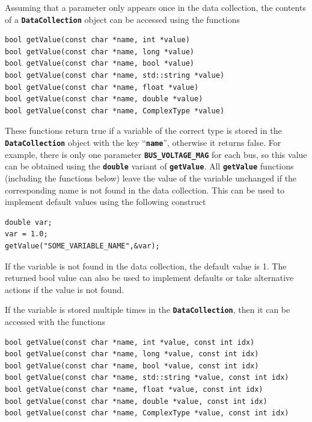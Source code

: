 Assuming that a parameter only appears once in the data collection, the contents of a \texttt{\textbf{DataCollection}} object can be accessed using the functions

{
\color{red}
\begin{Verbatim}[fontseries=b]
bool getValue(const char *name, int *value)
bool getValue(const char *name, long *value)
bool getValue(const char *name, bool *value)
bool getValue(const char *name, std::string *value)
bool getValue(const char *name, float *value)
bool getValue(const char *name, double *value)
bool getValue(const char *name, ComplexType *value)
\end{Verbatim}
}

These functions return true if a variable of the correct type is stored in the \texttt{\textbf{DataCollection}} object with the key ``\texttt{\textbf{name}}'', otherwise it returns false. For example, there is only one parameter \texttt{\textbf{BUS\_VOLTAGE\_MAG}} for each bus, so this value can be obtained using the \texttt{\textbf{double}} variant of \texttt{\textbf{getValue}}.
All \texttt{\textbf{getValue}} functions (including the functions below) leave the value of the variable unchanged if the corresponding name is not found in the data collection. This can be used to implement default values using the following construct

{
\color{red}
\begin{Verbatim}[fontseries=b]
double var;
var = 1.0;
getValue("SOME_VARIABLE_NAME",&var);
\end{Verbatim}
}

If the variable is not found in the data collection, the default value is 1. The returned bool value can also be used to implement defaults or take alternative actions if the value is not found.

If the variable is stored multiple times in the \texttt{\textbf{DataCollection}}, then it can be accessed with the functions

{
\color{red}
\begin{Verbatim}[fontseries=b]
bool getValue(const char *name, int *value, const int idx)
bool getValue(const char *name, long *value, const int idx)
bool getValue(const char *name, bool *value, const int idx)
bool getValue(const char *name, std::string *value, const int idx)
bool getValue(const char *name, float *value, const int idx)
bool getValue(const char *name, double *value, const int idx)
bool getValue(const char *name, ComplexType *value, const int idx)
\end{Verbatim}
}

